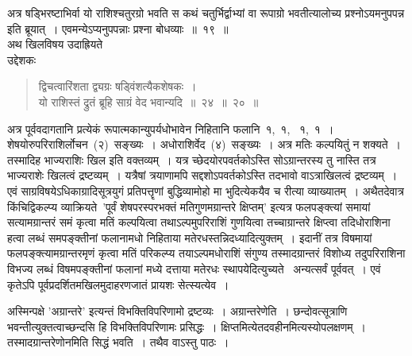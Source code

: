 \documentclass[11pt, openany]{book}
\begin{document}
\indent
अत्र षड्भिरष्टाभिर्वा यो राशिश्चतुरग्रो भवति स कथं चतुर्भिर्द्वाभ्यां वा रूपाग्रो भवतीत्यालोच्य प्रश्नोऽयमनुपपन्न इति ब्रूयात्~। एवमन्येऽप्यनुपपन्नाः प्रश्ना बोधव्याः~॥~१९~॥\\

\indent
अथ खिलविषय उदाह्रियते \textendash\\

उद्देशकः\textendash
\begin{quote}
{\ku द्विचत्वारिंशता द्व्यग्रः षड्विंशत्यैकशेषकः~।\\
यो राशिस्तं द्रुतं ब्रूहि साग्रं वेद भवान्यदि~॥~२४~॥~२०~॥}
\end{quote}

\indent
अत्र पूर्ववदागतानि प्रत्येकं रूपात्मकान्युपर्यधोभावेन निहितानि फलानि~१,~१,
~१,~१~। शेषयोरुपरिराशिर्लोचन~(२)~सङ्ख्यः~। अधोराशिर्वेद~(४)~सङ्ख्यः~। अत्र मतिः कल्पयितुं न शक्यते~। तस्मादिह भाज्यराशिः खिल इति वक्तव्यम्~। यत्र च्छेदयोरपवर्तकोऽस्ति सोऽग्रान्तरस्य तु नास्ति तत्र भाज्यराशेः खिलत्वं द्रष्टव्यम्~। यत्रैषां त्रयाणामपि सद्दशोऽपवर्तकोऽस्ति तदभावो वाऽत्राखिलत्वं द्रष्टव्यम्~। एवं साग्रविषयेऽधिकाग्रादिसूत्रयुगं प्रतिपत्तॄणां बुद्धिव्यामोहो मा भुदित्येकयैव च रीत्या व्याख्यातम्~। अथैतदेवात्र किंचिद्विकल्प्य व्याक्रियते\textendash\ 'पूर्वं शेषपरस्परभक्तं मतिगुणमग्रान्तरे क्षिप्तम्' इत्यत्र फलपङ्क्त्यां समायां सत्यामग्रान्तरं समं कृत्वा मतिं कल्पयित्वा तथाऽल्पमुपरिराशिं गुणयित्वा तच्चाग्रान्तरे क्षिप्त्वा तदिधोराशिना हत्वा लब्धं समपङ्क्तीनां फलानामधो निहिताया मतेरधस्तन्निदध्यादित्युक्तम्~। इदानीं तत्र विषमायां फलपङ्क्त्यामग्रान्तरमृणं कृत्वा मतिं परिकल्प्य तयाऽल्पमधोराशिं संगुण्य तस्मादग्रान्तरं विशोध्य तदुपरिराशिना विभज्य लब्धं विषमपङ्क्तीनां फलानां मध्ये दत्ताया मतेरधः स्थापयेदित्युच्यते \textendash\ अन्यत्सर्वं पूर्ववत्~। एवं कृतेऽपि पूर्वप्रदर्शितमखिलमुदाहरणजातं प्रायशः सेत्स्यत्येव~।

\newpage
\thispagestyle{fancy}
\fancyhf{}

\noindent
अस्मिन्पक्षे 'अग्रान्तरे' इत्यन्तं विभक्तिविपरिणामो द्रष्टव्यः~। अग्रान्तरेणेति~। छन्दोवत्सूत्राणि भवन्तीत्युक्तत्वाच्छन्दसि हि विभक्तिविपरिणामः प्रसिद्धः~। क्षिप्तमित्येतदवहीनमित्यस्योपलक्षणम्~। तस्मादग्रान्तरेणोनमिति सिद्धं भवति~। तथैव वाऽस्तु पाठः~।\\
\end{document}
